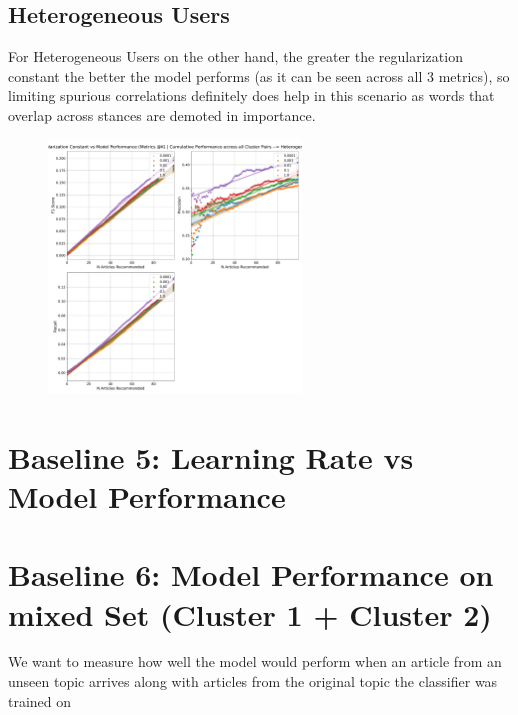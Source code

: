 \documentclass[a4paper,fontsize=9.0pt]{scrartcl}
\begin{document}
\subsection{Heterogeneous Users}
\begin{flushleft}
For Heterogeneous Users on the other hand, the greater the regularization constant the better the model performs (as it can be seen across all 3 metrics), so limiting spurious correlations definitely does help in this scenario as words that overlap across stances are demoted in importance. 
\end{flushleft}
\begin{figure}[H]
 \includegraphics[width=0.6\textwidth]{Graphs/regularization_vs_model_performance_cumu_Heterogeneous.pdf}
\end{figure}



\vspace{1ex}
\section{Baseline 5: Learning Rate vs Model Performance}

\vspace{1ex}
\section{Baseline 6: Model Performance on mixed Set (Cluster 1 + Cluster 2)}
\begin{flushleft}
We want to measure how well the model would perform when an article from an unseen topic arrives along with articles from the original topic the classifier was trained on
\end{flushleft}

\vspace{1ex}
\end{document}
